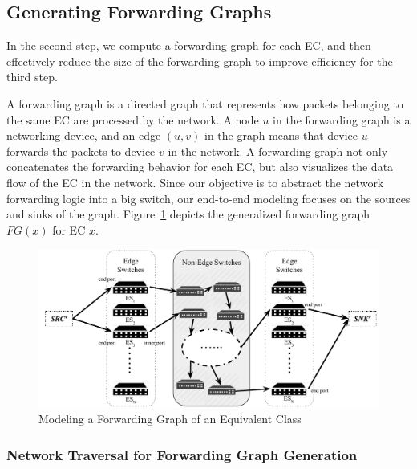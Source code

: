 \subsection{Generating Forwarding Graphs}
\label{Sec:Generating Forwarding Graphs}

In the second step, we compute a forwarding graph for each EC, and then effectively reduce the size of the forwarding graph to improve efficiency for the third step. 

A forwarding graph is a directed graph that represents how packets belonging to the same EC are processed by the network. A node $u$ in the forwarding graph is a networking device, and an edge $(u, v)$ in the graph means that device $u$ forwards the packets to device $v$ in the network. 
A forwarding graph not only concatenates the forwarding behavior for each EC, but also visualizes the data flow of the EC in the network. 
Since our objective is to abstract the network forwarding logic into a big switch, our end-to-end modeling focuses on the sources and sinks of the graph. 
Figure~\ref{Fig:ForwardingGraphECX} depicts the generalized forwarding graph $FG(x)$ for EC $x$. 
 

\begin{figure}[t]
\centering
\includegraphics[scale=.75]{figures/ForwardingGraph.pdf}
\caption{Modeling a Forwarding Graph of an Equivalent Class}
\label{Fig:ForwardingGraphECX}
\end{figure}

\subsubsection{Network Traversal for Forwarding Graph Generation}

